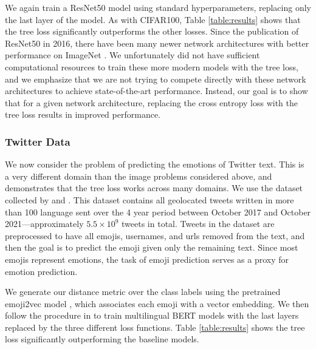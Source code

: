 \documentclass[twoside]{article}
\begin{document}
We again train a ResNet50 model \citep{He2016DeepRL} using standard hyperparameters, replacing only the last layer of the model.
As with CIFAR100, Table \ref{table:results} shows that the tree loss significantly outperforms the other losses.
Since the publication of ResNet50 in 2016,
there have been many newer network architectures with better performance on ImageNet \citep[e.g.][]{howard2017mobilenets,huang2017densely,pmlr-v97-tan19a}.
We unfortunately did not have sufficient computational resources to train these more modern models with the tree loss,
and we emphasize that we are not trying to compete directly with these network architectures to achieve state-of-the-art performance.
Instead, our goal is to show that for a given network architecture,
replacing the cross entropy loss with the tree loss results in improved performance.

\subsubsection{Twitter Data}

We now consider the problem of predicting the emotions of Twitter text.
This is a very different domain than the image problems considered above,
and demonstrates that the tree loss works across many domains.
We use the dataset collected by \citet{izbicki2019geolocating} and \citet{stoikos2020multilingual}.
This dataset contains all geolocated tweets written in more than 100 language sent over the 4 year period between October 2017 and October 2021---approximately $5.5\times10^9$ tweets in total.
Tweets in the dataset are preprocessed to have all emojis, usernames, and urls removed from the text,
and then the goal is to predict the emoji given only the remaining text.
Since most emojis represent emotions,
the task of emoji prediction serves as a proxy for emotion prediction.

We generate our distance metric over the class labels using the pretrained emoji2vec model \citep{Eisner2016emoji2vecLE},
which associates each emoji with a vector embedding.
We then follow the procedure in \citet{stoikos2020multilingual} to train multilingual BERT models \citep{Feng2020LanguageagnosticBS} with the last layers replaced by the three different loss functions.
Table \ref{table:results} shows the tree loss significantly outperforming the baseline models.
\end{document}
